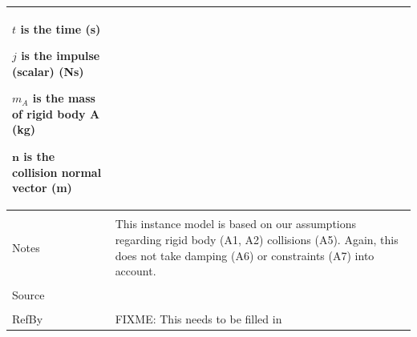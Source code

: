 \documentclass[12pt]{article}
\begin{document}
\begin{minipage}{\textwidth}
\begin{tabular}{p{} p{}}
\begin{symbDescription}
              \item{$t$ is the time (s)}
              \item{$j$ is the impulse (scalar) (Ns)}
              \item{${m_{A}}$ is the mass of rigid body A (kg)}
              \item{$\mathbf{n}$ is the collision normal vector (m)}
              \end{symbDescription}
\\ \midrule \\
Notes & This instance model is based on our assumptions regarding rigid body (A1, A2) collisions (A5). Again, this does not take damping (A6) or constraints (A7) into account.
\\ \midrule \\
Source & 
\\ \midrule \\
RefBy & FIXME: This needs to be filled in
\\ \bottomrule \end{tabular}
\end{minipage}\\
\end{document}
